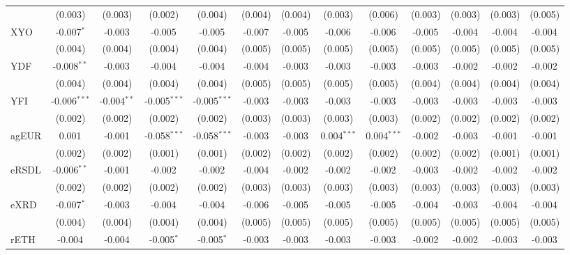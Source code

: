 \begin{table}[!htbp]
\begin{tabular}{@{\extracolsep{5pt}}lcccccccccccc}
  & (0.003) & (0.003) & (0.002) & (0.004) & (0.004) & (0.004) & (0.003) & (0.006) & (0.003) & (0.003) & (0.003) & (0.005) \\
 XYO & -0.007$^{*}$ & -0.003$^{}$ & -0.005$^{}$ & -0.005$^{}$ & -0.007$^{}$ & -0.005$^{}$ & -0.006$^{}$ & -0.006$^{}$ & -0.005$^{}$ & -0.004$^{}$ & -0.004$^{}$ & -0.004$^{}$ \\
  & (0.004) & (0.004) & (0.004) & (0.004) & (0.005) & (0.005) & (0.005) & (0.005) & (0.005) & (0.005) & (0.005) & (0.005) \\
 YDF & -0.008$^{**}$ & -0.003$^{}$ & -0.004$^{}$ & -0.004$^{}$ & -0.004$^{}$ & -0.003$^{}$ & -0.003$^{}$ & -0.003$^{}$ & -0.003$^{}$ & -0.002$^{}$ & -0.002$^{}$ & -0.002$^{}$ \\
  & (0.004) & (0.004) & (0.004) & (0.004) & (0.005) & (0.005) & (0.005) & (0.005) & (0.004) & (0.004) & (0.004) & (0.004) \\
 YFI & -0.006$^{***}$ & -0.004$^{**}$ & -0.005$^{***}$ & -0.005$^{***}$ & -0.003$^{}$ & -0.003$^{}$ & -0.003$^{}$ & -0.003$^{}$ & -0.003$^{}$ & -0.003$^{}$ & -0.003$^{}$ & -0.003$^{}$ \\
  & (0.002) & (0.002) & (0.002) & (0.002) & (0.003) & (0.003) & (0.003) & (0.003) & (0.002) & (0.002) & (0.002) & (0.002) \\
 agEUR & 0.001$^{}$ & -0.001$^{}$ & -0.058$^{***}$ & -0.058$^{***}$ & -0.003$^{}$ & -0.003$^{}$ & 0.004$^{***}$ & 0.004$^{***}$ & -0.002$^{}$ & -0.003$^{}$ & -0.001$^{}$ & -0.001$^{}$ \\
  & (0.002) & (0.002) & (0.001) & (0.001) & (0.002) & (0.002) & (0.002) & (0.002) & (0.002) & (0.002) & (0.001) & (0.001) \\
 eRSDL & -0.006$^{**}$ & -0.001$^{}$ & -0.002$^{}$ & -0.002$^{}$ & -0.004$^{}$ & -0.002$^{}$ & -0.002$^{}$ & -0.002$^{}$ & -0.003$^{}$ & -0.002$^{}$ & -0.002$^{}$ & -0.002$^{}$ \\
  & (0.002) & (0.002) & (0.002) & (0.002) & (0.003) & (0.003) & (0.003) & (0.003) & (0.003) & (0.003) & (0.003) & (0.003) \\
 eXRD & -0.007$^{*}$ & -0.003$^{}$ & -0.004$^{}$ & -0.004$^{}$ & -0.006$^{}$ & -0.005$^{}$ & -0.005$^{}$ & -0.005$^{}$ & -0.004$^{}$ & -0.003$^{}$ & -0.004$^{}$ & -0.004$^{}$ \\
  & (0.004) & (0.004) & (0.004) & (0.004) & (0.005) & (0.005) & (0.005) & (0.005) & (0.005) & (0.005) & (0.005) & (0.005) \\
 rETH & -0.004$^{}$ & -0.004$^{}$ & -0.005$^{*}$ & -0.005$^{*}$ & -0.003$^{}$ & -0.003$^{}$ & -0.003$^{}$ & -0.003$^{}$ & -0.002$^{}$ & -0.002$^{}$ & -0.003$^{}$ & -0.003$^{}$ \\

\end{tabular}
\end{table}
